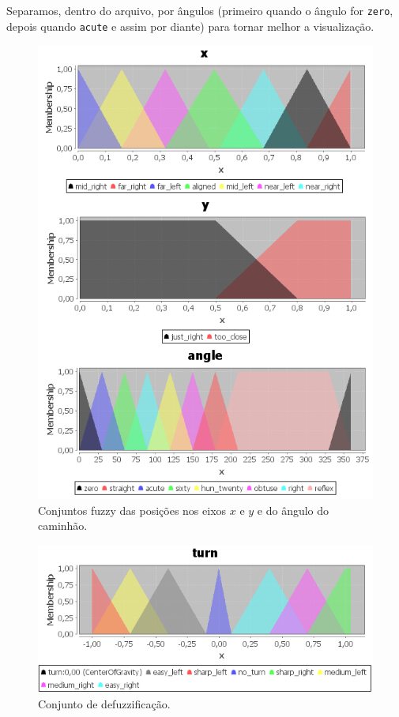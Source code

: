 \documentclass{article}
\begin{document}
Separamos, dentro do arquivo, por ângulos (primeiro quando o ângulo for \texttt{zero}, depois quando \texttt{acute} e assim por diante) para tornar melhor a visualização.

\begin{figure}[h!]
    \centering
    \includegraphics[scale=0.7]{figure1.png}
    \caption{Conjuntos fuzzy das posições nos eixos $x$ e $y$ e do ângulo do caminhão.}
    \label{fig01}
\end{figure}

\begin{figure}[h!]
    \centering
    \includegraphics[scale=0.7]{figure2.png}
    \caption{Conjunto de defuzzificação.}
    \label{fig02}
\end{figure}
\end{document}
